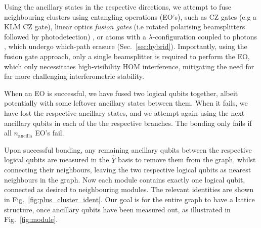 \documentclass[aps,rmp,twocolumn,amsmath,amssymb,nofootinbib,superscriptaddress]{revtex4}
\begin{document}
Using the ancillary states in the respective directions, we attempt to fuse neighbouring clusters using entangling operations (EO's), such as CZ gates (e.g a KLM CZ gate), linear optics \emph{fusion gates} (i.e rotated polarising beamsplitters followed by photodetection) \cite{bib:BrowneRudolph05}, or atoms with a $\lambda$-configuration coupled to photons \cite{bib:BarrettKok05}, which undergo which-path erasure (Sec.~\ref{sec:hybrid}). Importantly, using the fusion gate approach, only a single beamsplitter is required to perform the EO, which only necessitates high-visibility HOM \cite{HOM} interference, mitigating the need for far more challenging interferometric stability.

When an EO is successful, we have fused two logical qubits together, albeit potentially with some leftover ancillary states between them. When it fails, we have lost the respective ancillary states, and we attempt again using the next ancillary qubits in each of the the respective branches. The bonding only fails if all $n_\mathrm{ancilla}$ EO's fail.

Upon successful bonding, any remaining ancillary qubits between the respective logical qubits are measured in the $\hat{Y}$ basis to remove them from the graph, whilst connecting their neighbours, leaving the two respective logical qubits as nearest neighbours in the graph. Now each module contains exactly one logical qubit, connected as desired to neighbouring modules. The relevant identities are shown in Fig.~\ref{fig:plus_cluster_ident}. Our goal is for the entire graph to have a lattice structure, once ancillary qubits have been measured out, as illustrated in Fig.~\ref{fig:module}.
\end{document}
